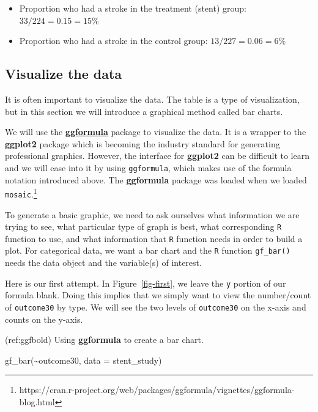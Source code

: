 \documentclass[
  letterpaper,
  DIV=11,
  numbers=noendperiod]{scrreprt}
\newenvironment{Shaded}{\begin{snugshade}}{\end{snugshade}}
\newcommand{\AttributeTok}[1]{\textcolor[rgb]{0.40,0.45,0.13}{#1}}
\newcommand{\FunctionTok}[1]{\textcolor[rgb]{0.28,0.35,0.67}{#1}}
\newcommand{\NormalTok}[1]{\textcolor[rgb]{0.00,0.23,0.31}{#1}}
\newcommand{\SpecialCharTok}[1]{\textcolor[rgb]{0.37,0.37,0.37}{#1}}
\begin{document}
\begin{itemize}
\item
  Proportion who had a stroke in the treatment (stent) group:
  \(33/224 = 0.15 = 15\%\)
\item
  Proportion who had a stroke in the control group:
  \(13/227 = 0.06 = 6\%\)
\end{itemize}

\subsection{Visualize the data}\label{visualize-the-data}

It is often important to visualize the data. The table is a type of
visualization, but in this section we will introduce a graphical method
called bar charts.

We will use the
\href{https://cran.r-project.org/web/packages/ggformula/vignettes/ggformula.html}{\textbf{ggformula}}
package to visualize the data. It is a wrapper to the \textbf{ggplot2}
package which is becoming the industry standard for generating
professional graphics. However, the interface for \textbf{ggplot2} can
be difficult to learn and we will ease into it by using
\texttt{ggformula}, which makes use of the formula notation introduced
above. The \textbf{ggformula} package was loaded when we loaded
\texttt{mosaic}.\footnote{https://cran.r-project.org/web/packages/ggformula/vignettes/ggformula-blog.html}

To generate a basic graphic, we need to ask ourselves what information
we are trying to see, what particular type of graph is best, what
corresponding \texttt{R} function to use, and what information that
\texttt{R} function needs in order to build a plot. For categorical
data, we want a bar chart and the \texttt{R} function \texttt{gf\_bar()}
needs the data object and the variable(s) of interest.

Here is our first attempt. In Figure~\ref{fig-first}, we leave the
\texttt{y} portion of our formula blank. Doing this implies that we
simply want to view the number/count of \texttt{outcome30} by type. We
will see the two levels of \texttt{outcome30} on the x-axis and counts
on the y-axis.

(ref:ggfbold) Using \textbf{ggformula} to create a bar chart.

\begin{Shaded}
\begin{Highlighting}[]
\FunctionTok{gf\_bar}\NormalTok{(}\SpecialCharTok{\textasciitilde{}}\NormalTok{outcome30, }\AttributeTok{data =}\NormalTok{ stent\_study)}
\end{Highlighting}
\end{Shaded}
\end{document}
